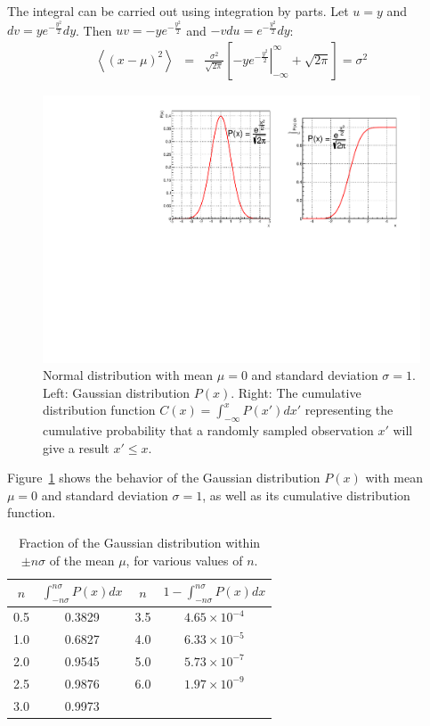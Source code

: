 \documentclass{revtex4}
\begin{document}
The integral can be carried out using integration by parts. Let $u =
y$ and $dv = ye^{-\frac{y^2}{2}} dy$. Then $uv = -ye^{-\frac{y^2}{2}}$
and $-v du =e^{-\frac{y^2}{2}} dy$:
\begin{eqnarray}
  \left<(x-\mu)^2\right> &=& \frac{\sigma^2}{\sqrt{2\pi}}
  \left[\left.-ye^{-\frac{y^2}{2}}\right|_{-\infty}^{\infty} +
    \sqrt{2\pi} \right] = \sigma^2
\end{eqnarray}
\begin{figure}[h]
  \begin{center}
    \includegraphics[width=.98\textwidth]{Gaussian.pdf}
  \end{center}
  \caption{\label{fig:Gauss} Normal distribution with mean $\mu = 0$ and
    standard deviation $\sigma = 1$. Left: Gaussian distribution $P(x)$. Right: The
    cumulative distribution function $C(x) = \int_{-\infty}^x P(x') dx'$
    representing the cumulative probability that a randomly sampled
    observation $x'$ will give a result $x' \le x$.}
\end{figure}
Figure~\ref{fig:Gauss} shows the behavior of the Gaussian distribution
$P(x)$ with mean $\mu = 0$ and standard deviation $\sigma = 1$, as
well as its cumulative distribution function. 
\begin{table}[h]
  \begin{center}
    \begin{tabular}{cc|cc}
      \hline \hline 
      $n$ & $\int_{-n\sigma}^{n\sigma} P(x)dx$ & $n$ & $1 - \int_{-n\sigma}^{n\sigma} P(x)dx$ \\ \hline 
      0.5 & 0.3829 & 3.5 & $4.65 \times 10^{-4}$ \\ 
      1.0 & 0.6827 & 4.0 & $6.33 \times 10^{-5}$ \\ 
      2.0 & 0.9545 & 5.0 & $5.73 \times 10^{-7}$ \\
      2.5 & 0.9876 & 6.0 & $1.97 \times 10^{-9}$ \\
      3.0 & 0.9973 & &  \\ \hline 
    \end{tabular}
  \end{center}
  \caption{\label{tab:erf} Fraction of the Gaussian distribution within $\pm n\sigma$ of the mean $\mu$, for various values of $n$.}
\end{table}
\end{document}
